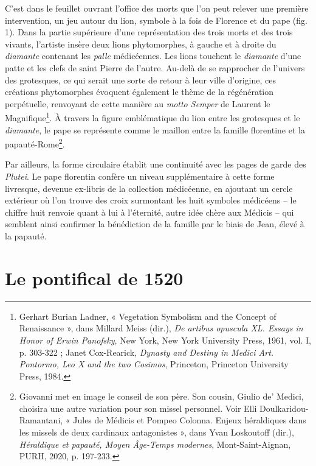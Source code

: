 \documentclass[12pt,twoside,openany]{book}
\begin{document}
C’est dans le feuillet ouvrant l’office des morts que l’on peut relever une première intervention, un jeu autour du lion, symbole à la fois de Florence et du pape (fig. 1). Dans la partie supérieure d’une représentation des trois morts et des trois vivants, l’artiste insère deux lions phytomorphes, à gauche et à droite du \textit{diamante} contenant les \textit{palle }médicéennes. Les lions touchent le \textit{diamante} d’une patte et les clefs de saint Pierre de l’autre. Au-delà de se rapprocher de l’univers des grotesques, ce qui serait une sorte de retour à leur ville d’origine, ces créations phytomorphes évoquent également le thème de la régénération perpétuelle, renvoyant de cette manière au \textit{motto Semper} de Laurent le Magnifique\footnote{Gerhart Burian Ladner, « Vegetation Symbolism and the Concept of Renaissance », dans Millard Meiss (dir.), \textit{De artibus opuscula XL. Essays in Honor of Erwin Panofsky}, New York, New York University Press, 1961, vol. I, p. 303-322 ; Janet Cox-Rearick,\textit{ Dynasty and Destiny in Medici Art. Pontormo, Leo X and the two Cosimos}, Princeton, Princeton University Press, 1984.}. À travers la figure emblématique du lion entre les grotesques et le \textit{diamante}, le pape se représente comme le maillon entre la famille florentine et la papauté-Rome\footnote{Giovanni met en image le conseil de son père. Son cousin, Giulio de’ Medici, choisira une autre variation pour son missel personnel. Voir Elli Doulkaridou-Ramantani, « Jules de Médicis et Pompeo Colonna. Enjeux héraldiques dans les missels de deux cardinaux antagonistes », dans Yvan Loskoutoff (dir.), \textit{Héraldique et papauté, Moyen Âge-Temps modernes}, Mont-Saint-Aignan, PURH, 2020, p. 197-233.}.

Par ailleurs, la forme circulaire établit une continuité avec les pages de garde des \textit{Plutei}. Le pape florentin confère un niveau supplémentaire à cette forme livresque, devenue ex-libris de la collection médicéenne, en ajoutant un cercle extérieur où l’on trouve des croix surmontant les huit symboles médicéens – le chiffre huit renvoie quant à lui à l’éternité, autre idée chère aux Médicis – qui semblent ainsi confirmer la bénédiction de la famille par le biais de Jean, élevé à la papauté.

\section{Le pontifical de 1520}
\end{document}

